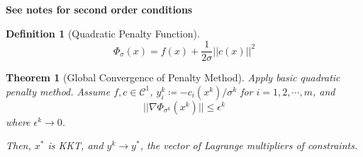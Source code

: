 \documentclass[a4paper]{article}
\newcommand{\C}{\mathcal{C}}
\newcommand{\norm}[1]{\lvert \lvert #1 \rvert \rvert}
\newtheorem{theorem}{Theorem}
\newtheorem*{definition*}{Definition}
\begin{document}
\textbf{See notes for second order conditions}

\begin{definition*}[Quadratic Penalty Function]
    \begin{equation*}
        \Phi_\sigma (x) = f(x) + \frac{1}{2\sigma} \norm{c(x)}^2
    \end{equation*}
\end{definition*}

\setcounter{theorem}{20}
\begin{theorem}[Global Convergence of Penalty Method]
    Apply basic quadratic penalty method.
    Assume $f,c \in \C^1$, $y_i^k \coloneqq -c_i \left( x^k \right) / \sigma^k$ for $i = 1, 2, \cdots, m$, and
    \begin{equation*}
        \norm{\nabla \Phi_{\sigma^k} \left( x^k \right)} \leq \epsilon^k
    \end{equation*}
    where $\epsilon^k \rightarrow 0$.

    Then,
    $x^*$ is KKT, and $y^k \rightarrow y^*$, the vector of Lagrange multipliers of constraints.
\end{theorem}
\end{document}
